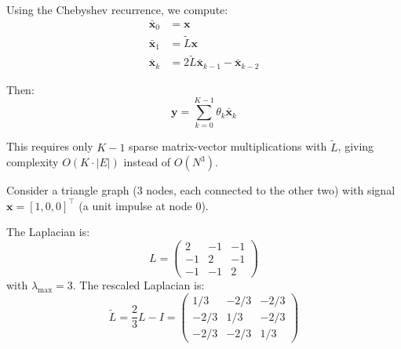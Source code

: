 \begin{notechapter}
Using the Chebyshev recurrence, we compute:
\begin{align}
\bar{\mathbf{x}}_0 &= \mathbf{x} \\
\bar{\mathbf{x}}_1 &= \tilde{L} \mathbf{x} \\
\bar{\mathbf{x}}_k &= 2\tilde{L} \bar{\mathbf{x}}_{k-1} - \bar{\mathbf{x}}_{k-2}
\end{align}

Then:
\[
\mathbf{y} = \sum_{k=0}^{K-1} \theta_k \bar{\mathbf{x}}_k
\]

This requires only $K - 1$ sparse matrix-vector multiplications with $\tilde L$,
giving complexity $O(K \cdot |E|)$ instead of $O(N^3)$.

\begin{example}
Consider a triangle graph (3 nodes, each connected to the other two)
with signal $\mathbf{x} = [1, 0, 0]^\top$ (a unit impulse at node 0).

\begin{center}
\end{center}

The Laplacian is:
\[
L = \begin{pmatrix} 2 & -1 & -1 \\ -1 & 2 & -1 \\ -1 & -1 & 2 \end{pmatrix}
\]
with $\lambda_{\max} = 3$. The rescaled Laplacian is:
\[
\tilde{L} = \frac{2}{3}L - I =
\begin{pmatrix} 1/3 & -2/3 & -2/3 \\ -2/3 & 1/3 & -2/3 \\ -2/3 & -2/3 & 1/3 \end{pmatrix}
\]


\end{example}
\end{notechapter}
